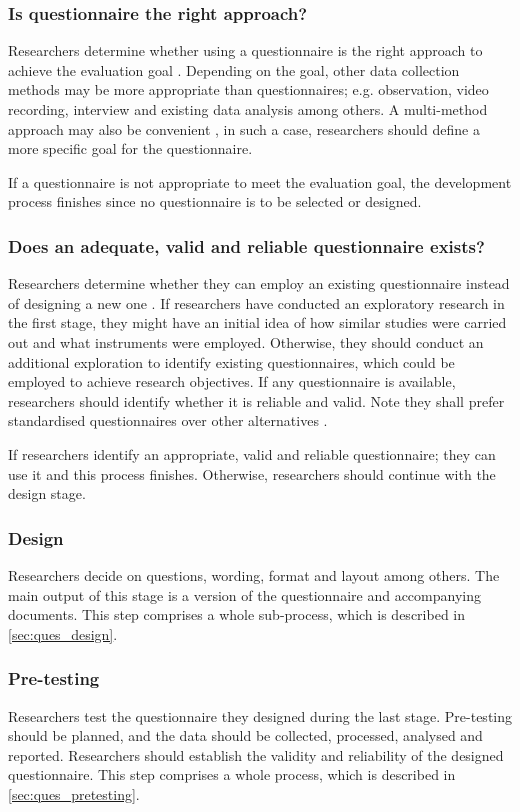 \subsubsection{Is questionnaire the right approach?}
Researchers determine whether using a questionnaire is the right approach to achieve the evaluation goal \cite{Boynton2004c}. Depending on the goal, other data collection methods may be more appropriate than questionnaires; e.g. observation, video recording, interview and existing data analysis among others. A multi-method approach may also be convenient \cite{Boynton2004c,Krosnick2009}, in such a case, researchers should define a more specific goal for the questionnaire.

If a questionnaire is not appropriate to meet the evaluation goal, the development process finishes since no questionnaire is to be selected or designed.

\subsubsection{Does an adequate, valid and reliable questionnaire exists?}
Researchers determine whether they can employ an existing questionnaire instead of designing a new one \cite{Boynton2004c}. If researchers have conducted an exploratory research in the first stage, they might have an initial idea of how similar studies were carried out and what instruments were employed. Otherwise, they should conduct an additional exploration to identify existing questionnaires, which could be employed to achieve research objectives. If any questionnaire is available, researchers should identify whether it is reliable and valid. Note they shall prefer standardised questionnaires over other alternatives \cite{Boynton2004c}.

If researchers identify an appropriate, valid and reliable questionnaire; they can use it and this process finishes. Otherwise, researchers should continue with the design stage.

\subsubsection{Design}
Researchers decide on questions, wording, format and layout among others. The main output of this stage is a version of the questionnaire and accompanying documents. This step comprises a whole sub-process, which is described in \autoref{sec:ques_design}.

\subsubsection{Pre-testing}
Researchers test the questionnaire they designed during the last stage. Pre-testing should be planned, and the data should be collected, processed, analysed and reported. Researchers should establish the validity and reliability of the designed questionnaire. This step comprises a whole process, which is described in \autoref{sec:ques_pretesting}.


